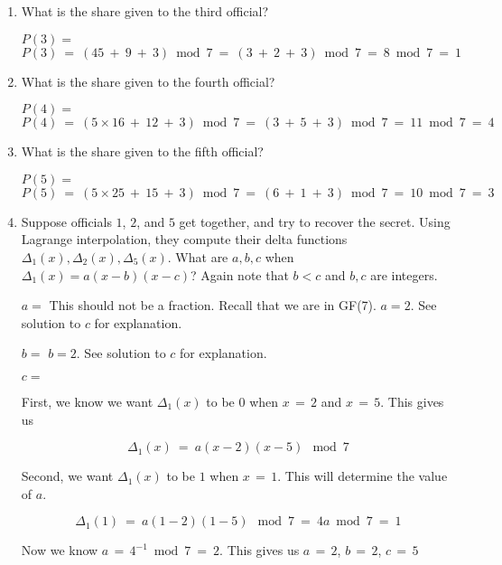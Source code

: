 \documentclass[11pt, preview]{standalone} %
\begin{document}
\begin{enumerate}
\begin{enumerate}
\item What is the share given to the third official?
 \begin{Freeform}{1}
 $P(3) = $
 \Solution $$P(3)\ =\ (45\ +\ 9\ +\ 3) \bmod 7\ =\ (3\ +\ 2\ +\ 3) \bmod 7\ =\ 8 \bmod 7\ =\ 1$$
 \end{Freeform}
 
  \item What is the share given to the fourth official?
 \begin{Freeform}{4}
 $P(4) = $
 \Solution $$P(4)\ =\ (5 \times 16\ +\ 12\ +\ 3) \bmod 7\ =\ (3\ +\ 5\ +\ 3) \bmod 7\ =\ 11 \bmod 7\ =\ 4$$
 \end{Freeform}
 
  \item What is the share given to the fifth official?
 \begin{Freeform}{3}
 $P(5) = $
 \Solution $$P(5)\ =\ (5 \times 25\ +\ 15\ +\ 3) \bmod 7\ =\ (6\ +\ 1\ +\ 3) \bmod 7\ =\ 10 \bmod 7\ =\ 3$$
 \end{Freeform}
 
 \item Suppose officials $1$, $2$, and $5$ get together, and try to recover the secret. Using Lagrange interpolation, they compute their delta functions $\Delta_1(x), \Delta_2(x), \Delta_5(x)$. What are $a,b,c$ when $\Delta_1(x) = a(x-b)(x-c)$? Again note that $b < c$ and $b,c$ are integers.
  \begin{Freeform}{2}
 $a = $
 \Hint This should not be a fraction. Recall that we are in GF(7).
 \Solution $a = 2$. See solution to $c$ for explanation.
 \end{Freeform}
  \begin{Freeform}{2}
 $b = $
 \Solution $b = 2$. See solution to $c$ for explanation.
 \end{Freeform}
  \begin{Freeform}{5}
 $c = $

 \Solution First, we know we want $\Delta_1(x)$ to be $0$ when $x\, =\, 2$ and $x\, =\, 5$. This gives us 

 $$\Delta_1(x)\ =\ a(x - 2)(x - 5)\ \bmod 7$$

 Second, we want $\Delta_1(x)$ to be $1$ when $x\, =\, 1$. This will determine the value of $a$.

 $$\Delta_1(1)\ =\ a(1 - 2)(1 - 5)\ \bmod 7\ =\ 4 a \bmod 7\ =\ 1$$

 Now we know $a\, =\, 4^{-1} \bmod 7\ =\ 2$. This gives us $a\, =\, 2$, $b\, =\, 2$, $c\, =\, 5$
 \end{Freeform}
 

\end{enumerate}
\end{enumerate}
\end{document}

